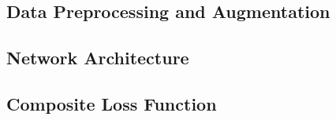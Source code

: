 \documentclass[conference]{IEEEtran}
\begin{document}
\subsection{Data Preprocessing and Augmentation}

\subsection{Network Architecture}

\subsection{Composite Loss Function}
\end{document}
